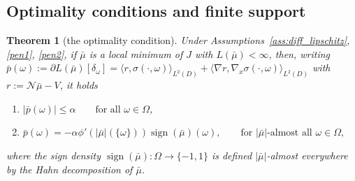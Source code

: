\documentclass[11pt]{amsart}
\newtheorem{theorem}{Theorem}[section]
\theoremstyle{definition}
\theoremstyle{remark}
\DeclareMathOperator{\sign}{sign}
\begin{document}
\subsection{Optimality conditions and finite support}
\begin{theorem}[the optimality condition]
\label{opt_cdt}
	Under Assumptions~\ref{ass:diff_lipschitz}, \ref{pen1}, \ref{pen2}, if $\bar{\mu}$ is a local minimum of $J$ with $L(\bar{\mu}) < \infty$, then, writing $\bar{p}(\omega) := \partial L(\bar{\mu})[\delta_\omega] = \langle r, \sigma(\cdot,\omega)\rangle_{L^2(D)} + \langle \nabla r, \nabla_x\sigma(\cdot,\omega)\rangle_{L^2(D)}$ with $r := \mathcal{N}\bar{\mu} - V$, it holds
	\begin{enumerate}
		\item $|\bar{p}(\omega)| \le \alpha \qquad \text{for all } \omega \in \Omega$,
		\item $\bar{p}(\omega) = -\alpha \phi'(|\bar{\mu}|(\{\omega\})) \sign(\bar{\mu})(\omega), \qquad \text{for } |\bar{\mu}|\text{-almost all } \omega \in \Omega,$
	\end{enumerate}
	where the sign density $\sign(\bar{\mu}): \Omega \rightarrow \{-1, 1\}$ is defined $|\bar{\mu}|$-almost everywhere by the Hahn decomposition of $\bar{\mu}$.
\end{theorem}
\end{document}
